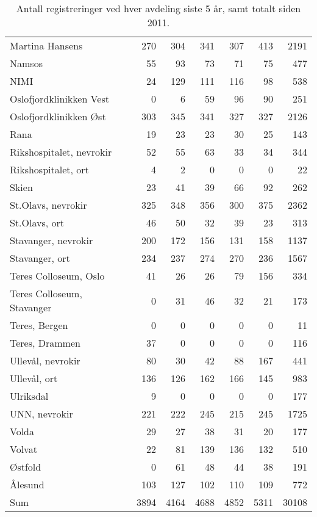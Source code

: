 \documentclass [norsk,a4paper,twoside]{article}\usepackage[]{graphicx}\usepackage[]{color}
\begin{document}
\begin{table}[ht]
\begin{tabular}{lrrrrrr}
  Martina Hansens & 270 & 304 & 341 & 307 & 413 & 2191 \\ 
  Namsos & 55 & 93 & 73 & 71 & 75 & 477 \\ 
  NIMI & 24 & 129 & 111 & 116 & 98 & 538 \\ 
  Oslofjordklinikken Vest & 0 & 6 & 59 & 96 & 90 & 251 \\ 
  Oslofjordklinikken Øst & 303 & 345 & 341 & 327 & 327 & 2126 \\ 
  Rana & 19 & 23 & 23 & 30 & 25 & 143 \\ 
  Rikshospitalet, nevrokir & 52 & 55 & 63 & 33 & 34 & 344 \\ 
  Rikshospitalet, ort & 4 & 2 & 0 & 0 & 0 & 22 \\ 
  Skien & 23 & 41 & 39 & 66 & 92 & 262 \\ 
  St.Olavs, nevrokir & 325 & 348 & 356 & 300 & 375 & 2362 \\ 
  St.Olavs, ort & 46 & 50 & 32 & 39 & 23 & 313 \\ 
  Stavanger, nevrokir & 200 & 172 & 156 & 131 & 158 & 1137 \\ 
  Stavanger, ort & 234 & 237 & 274 & 270 & 236 & 1567 \\ 
  Teres Colloseum, Oslo & 41 & 26 & 26 & 79 & 156 & 334 \\ 
  Teres Colloseum, Stavanger & 0 & 31 & 46 & 32 & 21 & 173 \\ 
  Teres, Bergen & 0 & 0 & 0 & 0 & 0 & 11 \\ 
  Teres, Drammen & 37 & 0 & 0 & 0 & 0 & 116 \\ 
  Ullevål, nevrokir & 80 & 30 & 42 & 88 & 167 & 441 \\ 
  Ullevål, ort & 136 & 126 & 162 & 166 & 145 & 983 \\ 
  Ulriksdal & 9 & 0 & 0 & 0 & 0 & 177 \\ 
  UNN, nevrokir & 221 & 222 & 245 & 215 & 245 & 1725 \\ 
  Volda & 29 & 27 & 38 & 31 & 20 & 177 \\ 
  Volvat & 22 & 81 & 139 & 136 & 132 & 510 \\ 
  Østfold & 0 & 61 & 48 & 44 & 38 & 191 \\ 
  Ålesund & 103 & 127 & 102 & 110 & 109 & 772 \\ 
  Sum & 3894 & 4164 & 4688 & 4852 & 5311 & 30108 \\ 
   \hline
\end{tabular}
\caption{Antall registreringer ved hver avdeling siste 5 år, samt totalt siden 2011.} 
\label{tab:AntReg}
\end{table}
\end{document}
